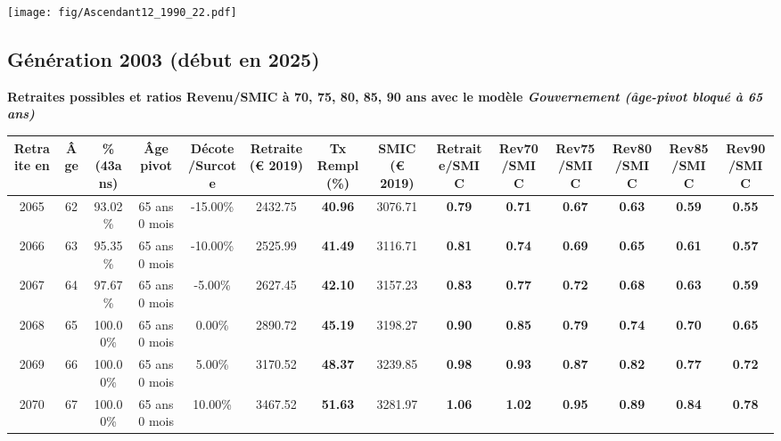  \vspace{0.1cm} 

 \begin{center}\texttt{[image: fig/Ascendant12\_1990\_22.pdf]}\end{center} \label{fig/Ascendant12_1990_22.pdf} 

\newpage 
 
\subsection{Génération 2003 (début en 2025)} 

{\bf \noindent Retraites possibles et ratios Revenu/SMIC à 70, 75, 80, 85, 90 ans avec le modèle \emph{Gouvernement (âge-pivot bloqué à 65 ans)}}  
 
\begin{adjustbox}{max width=\textwidth} 
\begin{tabular}[htb]{|c|c||c|c|c||c|c||c||c|c|c|c|c|c|} 
\hline 
 Retraite en &  Âge &  \%(43ans) &  Âge pivot &  Décote/Surcote &  Retraite (\euro{} 2019) &  Tx Rempl(\%) &  SMIC (\euro{} 2019) &  Retraite/SMIC &  Rev70/SMIC &  Rev75/SMIC &  Rev80/SMIC &  Rev85/SMIC &  Rev90/SMIC \\ 
\hline \hline 
 2065 &  62 &  93.02\% &  65 ans 0 mois &  -15.00\% &  2432.75 &  {\bf 40.96} &  3076.71 &  {\bf {\color{red} 0.79}} &  {\bf {\color{red} 0.71}} &  {\bf {\color{red} 0.67}} &  {\bf {\color{red} 0.63}} &  {\bf {\color{red} 0.59}} &  {\bf {\color{red} 0.55}} \\ 
\hline 
 2066 &  63 &  95.35\% &  65 ans 0 mois &  -10.00\% &  2525.99 &  {\bf 41.49} &  3116.71 &  {\bf {\color{red} 0.81}} &  {\bf {\color{red} 0.74}} &  {\bf {\color{red} 0.69}} &  {\bf {\color{red} 0.65}} &  {\bf {\color{red} 0.61}} &  {\bf {\color{red} 0.57}} \\ 
\hline 
 2067 &  64 &  97.67\% &  65 ans 0 mois &  -5.00\% &  2627.45 &  {\bf 42.10} &  3157.23 &  {\bf {\color{red} 0.83}} &  {\bf {\color{red} 0.77}} &  {\bf {\color{red} 0.72}} &  {\bf {\color{red} 0.68}} &  {\bf {\color{red} 0.63}} &  {\bf {\color{red} 0.59}} \\ 
\hline 
 2068 &  65 &  100.00\% &  65 ans 0 mois &  0.00\% &  2890.72 &  {\bf 45.19} &  3198.27 &  {\bf {\color{red} 0.90}} &  {\bf {\color{red} 0.85}} &  {\bf {\color{red} 0.79}} &  {\bf {\color{red} 0.74}} &  {\bf {\color{red} 0.70}} &  {\bf {\color{red} 0.65}} \\ 
\hline 
 2069 &  66 &  100.00\% &  65 ans 0 mois &  5.00\% &  3170.52 &  {\bf 48.37} &  3239.85 &  {\bf {\color{red} 0.98}} &  {\bf {\color{red} 0.93}} &  {\bf {\color{red} 0.87}} &  {\bf {\color{red} 0.82}} &  {\bf {\color{red} 0.77}} &  {\bf {\color{red} 0.72}} \\ 
\hline 
 2070 &  67 &  100.00\% &  65 ans 0 mois &  10.00\% &  3467.52 &  {\bf 51.63} &  3281.97 &  {\bf 1.06} &  {\bf 1.02} &  {\bf {\color{red} 0.95}} &  {\bf {\color{red} 0.89}} &  {\bf {\color{red} 0.84}} &  {\bf {\color{red} 0.78}} \\ 
\hline 
\hline 
\end{tabular} 
\end{adjustbox} 
 
